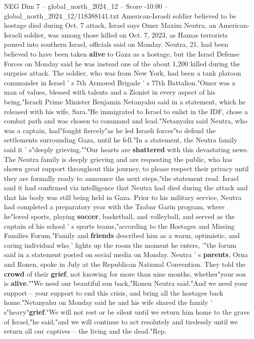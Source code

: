 \begin{textsample}{NEG Dim 7 – global\_north\_2024\_12 – Score -10.00 – global\_north\_2024\_12/118388141.txt}  \label{ex:f7_neg_155}
American-Israeli soldier believed to be hostage died during Oct. 7 attack, Israel says Omer Maxim Neutra, an American-Israeli soldier, was among those killed on Oct. 7, 2023, as Hamas terrorists poured into southern Israel, officials said on Monday.
Neutra, 21, had been believed to have been taken \textbf{alive} to Gaza as a hostage, but the Israel Defense Forces on Monday said he was instead one of the about 1,200 killed during the surprise attack.
The soldier, who was from New York, had been a tank platoon commander in Israel ' s 7th Armored Brigade ' s 77th Battalion."Omer was a man of values, blessed with talents and a Zionist in every aspect of his being,"Israeli Prime Minister Benjamin Netanyahu said in a statement, which he released with his wife, Sara."He immigrated to Israel to enlist in the IDF, chose a combat path and was chosen to command and lead."Netanyahu said Neutra, who was a captain, had"fought fiercely"as he led Israeli forces"to defend the settlements surrounding Gaza, until he fell."In a statement, the Neutra family said it ' s"deeply grieving.""Our hearts are \textbf{shattered} with this devastating news.
The Neutra family is deeply grieving and are requesting the public, who has shown great support throughout this journey, to please respect their privacy until they are formally ready to announce the next steps,"the statement read.
Israel said it had confirmed via intelligence that Neutra had died during the attack and that his body was still being held in Gaza.
Prior to his military service, Neutra had completed a preparatory year with the Tzabar Garin program, where he"loved sports, playing \textbf{soccer}, basketball, and volleyball, and served as the captain of his school ' s sports teams,"according to the Hostages and Missing Families Forum."Family and \textbf{friends} described him as a warm, optimistic, and caring individual who ' lights up the room the moment he enters, '"the forum said in a statement posted on social media on Monday.
Neutra ' s \textbf{parents}, Orna and Ronen, spoke in July at the Republican National Convention.
They told the \textbf{crowd} of their \textbf{grief}, not knowing for more than nine months, whether"your son is \textbf{alive}.""We need our beautiful son back,"Ronen Neutra said."And we need your support -- your support to end this crisis, and bring all the hostages back home."Netanyahu on Monday said he and his wife shared the family ' s"heavy"\textbf{grief}."We will not rest or be silent until we return him home to the grave of Israel,"he said,"and we will continue to act resolutely and tirelessly until we return all our captives -- the living and the dead."Rep.

\end{textsample}
